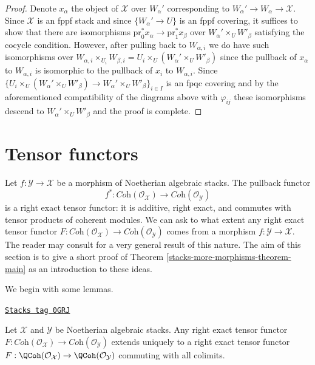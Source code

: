 \begin{proof}
\medskip\noindent
Denote $x_\alpha$ the object of $\mathcal{X}$ over $W_\alpha'$
corresponding to $W_\alpha' \to W_\alpha \to \mathcal{X}$.
Since $\mathcal{X}$ is an fppf stack and since
$\{W_\alpha' \to U\}$ is an fppf covering, it suffices
to show that there are isomorphisms
$\text{pr}_0^*x_\alpha \to \text{pr}_1^*x_\beta$
over $W_\alpha' \times_U W'_\beta$ satisfying the
cocycle condition. However, after pulling back to
$W_{\alpha, i}$ we do have such isomorphisms over
$W_{\alpha, i} \times_{U_i} W_{\beta, i} =
U_i \times_U (W_\alpha' \times_U W'_\beta)$
since the pullback of $x_\alpha$ to $W_{\alpha, i}$
is isomorphic to the pullback of $x_i$ to $W_{\alpha, i}$.
Since $\{U_i \times_U (W_\alpha' \times_U W'_\beta) \to
W_\alpha' \times_U W'_\beta\}_{i \in I}$
is an fpqc covering and by the aforementioned compatibility
of the diagrams above with $\varphi_{ij}$ these
isomorphisms descend to $W_\alpha' \times_U W'_\beta$
and the proof is complete.
\end{proof}

\section{Tensor functors}
\label{stacks-more-morphisms-section-tensor-functors}
Let $f : \mathcal{Y} \to \mathcal{X}$ be a morphism of Noetherian
algebraic stacks. The pullback functor
$$
f^* :
\textit{Coh}(\mathcal{O}_\mathcal{X})
\longrightarrow
\textit{Coh}(\mathcal{O}_\mathcal{Y})
$$
is a right exact tensor functor: it is additive, right exact,
and commutes with tensor products of coherent modules. We can
ask to what extent any right exact tensor functor
$F : \textit{Coh}(\mathcal{O}_\mathcal{X}) \to
\textit{Coh}(\mathcal{O}_\mathcal{Y})$ comes from a
morphism $f : \mathcal{Y} \to \mathcal{X}$.
The reader may consult
\cite{Hall-Rydh-coherent} for a very general result
of this nature.
The aim of this section is to give a short proof of
Theorem \ref{stacks-more-morphisms-theorem-main} as an introduction to these ideas.

\medskip\noindent
We begin with some lemmas.

\begin{lemma}[Extend]
\label{stacks-more-morphisms-lemma-extend}
\href{https://stacks.math.columbia.edu/tag/0GRJ}{\texttt{Stacks tag 0GRJ}}

Let $\mathcal{X}$ and $\mathcal{Y}$ be Noetherian algebraic stacks.
Any right exact tensor functor $F : \textit{Coh}(\mathcal{O}_\mathcal{X}) \to
\textit{Coh}(\mathcal{O}_\mathcal{Y})$ extends uniquely to a
right exact tensor functor
$F : \QCoh(\mathcal{O}_\mathcal{X}) \to \QCoh(\mathcal{O}_\mathcal{Y})$
commuting with all colimits.
\end{lemma}

